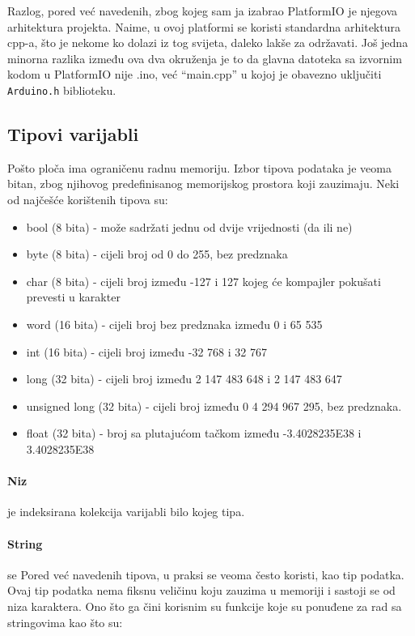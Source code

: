 \documentclass[../Document.tex]{subfiles}
\begin{document}
Razlog, pored već navedenih, zbog kojeg sam ja izabrao PlatformIO je njegova arhitektura projekta. Naime, u ovoj platformi se koristi standardna arhitektura cpp-a, što je nekome ko dolazi iz tog svijeta, daleko lakše za održavati. Još jedna minorna razlika između ova dva okruženja je to da glavna datoteka sa izvornim kodom u PlatformIO nije .ino, već ``main.cpp'' u kojoj je obavezno uključiti \verb|Arduino.h| biblioteku.

\subsection{Tipovi varijabli}

Pošto ploča ima ograničenu radnu memoriju. Izbor tipova podataka je veoma bitan, zbog njihovog predefinisanog memorijskog prostora koji zauzimaju. Neki od najčešće korištenih tipova su:

\begin{itemize}
  \item bool (8 bita) - može sadržati jednu od dvije vrijednosti (da ili ne)
  \item byte (8 bita) - cijeli broj od 0 do 255, bez predznaka
  \item char (8 bita) - cijeli broj između -127 i 127 kojeg će kompajler pokušati prevesti u karakter
  \item word (16 bita) - cijeli broj bez predznaka između 0 i 65 535
  \item int (16 bita) - cijeli broj između -32 768 i 32 767
  \item long (32 bita) - cijeli broj između 2 147 483 648 i 2 147 483 647
  \item unsigned long (32 bita) - cijeli broj između 0 4 294 967 295, bez predznaka.
  \item float (32 bita) -  broj sa plutajućom tačkom između -3.4028235E38 i 3.4028235E38
\end{itemize}

\paragraph{Niz} je indeksirana kolekcija varijabli bilo kojeg tipa.

\paragraph{String} se Pored već navedenih tipova, u praksi se veoma često koristi, kao tip podatka. Ovaj tip podatka nema fiksnu veličinu koju zauzima u memoriji i sastoji se od niza karaktera. Ono što ga čini korisnim su funkcije koje su ponuđene za rad sa stringovima kao što su:
\end{document}
